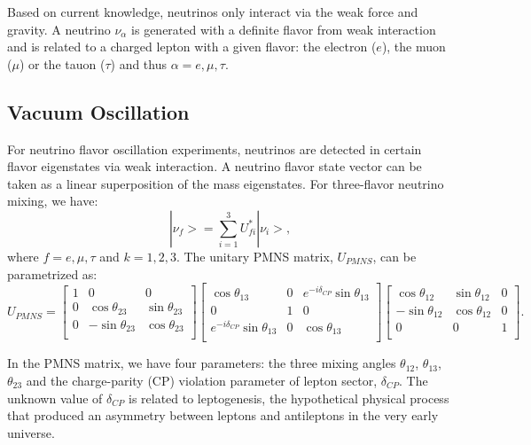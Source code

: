 Based on current knowledge, neutrinos only interact via the weak force and gravity. A neutrino $\nu_\alpha$ is generated with a definite flavor from weak interaction and is related to a charged lepton with a given flavor: the electron ($e$), the muon ($\mu$) or the tauon ($\tau$) and thus $\alpha=e,\mu,\tau$.

\subsection{Vacuum Oscillation}
For neutrino flavor oscillation experiments, neutrinos are detected in certain flavor eigenstates via weak interaction. A neutrino flavor state vector can be taken as a linear superposition of the mass eigenstates. For three-flavor neutrino mixing, we have\cite{pdg2018}:
\begin{equation}\label{eq:mixingmatrix}
|\nu_f> = \sum_{i=1}^3U^*_{fi}|\nu_i>, 
\end{equation}
where $f=e,\mu,\tau$ and $k=1,2,3$. The unitary PMNS matrix, $U_{PMNS}$, can be parametrized as: 
\begin{equation}
U_{PMNS} =
\begin{bmatrix}
1 &0 &0\\
0 &\cos\theta_{23} &\sin\theta_{23}\\
0 &-\sin\theta_{23} &\cos\theta_{23}\\ 
\end{bmatrix}
\begin{bmatrix}
\cos\theta_{13} &0 &e^{-i\delta_{CP}}\sin\theta_{13}\\
0 &1 &0\\
e^{-i\delta_{CP}}\sin\theta_{13} &0 &\cos\theta_{13}\\ 
\end{bmatrix}
\begin{bmatrix}
\cos\theta_{12} &\sin\theta_{12} &0\\
-\sin\theta_{12} &\cos\theta_{12} &0\\
0 &0 &1\\ 
\end{bmatrix}.
\end{equation}

In the PMNS matrix, we have four parameters: the three mixing angles $\theta_{12}$, $\theta_{13}$, $\theta_{23}$ and the charge-parity (CP) violation parameter of lepton sector, $\delta_{CP}$. The unknown value of $\delta_{CP}$ is related to leptogenesis, the hypothetical physical process that produced an asymmetry between leptons and antileptons in the very early universe\cite{wiki_cp}. 

